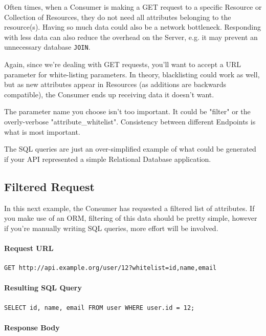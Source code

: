 \documentclass{book}
\begin{document}
Often times, when a Consumer is making a GET request to a specific Resource or Collection of Resources, they do not need all attributes belonging to the resource(s). Having so much data could also be a network bottleneck. Responding with less data can also reduce the overhead on the Server, e.g. it may prevent an unnecessary database \texttt{JOIN}.

Again, since we're dealing with GET requests, you'll want to accept a URL parameter for white-listing parameters. In theory, blacklisting could work as well, but as new attributes appear in Resources (as additions are backwards compatible), the Consumer ends up receiving data it doesn't want.

The parameter name you choose isn't too important. It could be "filter" or the overly-verbose "attribute\_whitelist". Consistency between different Endpoints is what is most important.

The SQL queries are just an over-simplified example of what could be generated if your API represented a simple Relational Database application.

\subsection{Filtered Request}

In this next example, the Consumer has requested a filtered list of attributes. If you make use of an ORM, filtering of this data should be pretty simple, however if you're manually writing SQL queries, more effort will be involved.

\paragraph{\textbf{Request URL}}

\begin{verbatim}
GET http://api.example.org/user/12?whitelist=id,name,email
\end{verbatim}

\paragraph{\textbf{Resulting SQL Query}}

\begin{verbatim}
SELECT id, name, email FROM user WHERE user.id = 12;
\end{verbatim}

\paragraph{\textbf{Response Body}}
\end{document}
